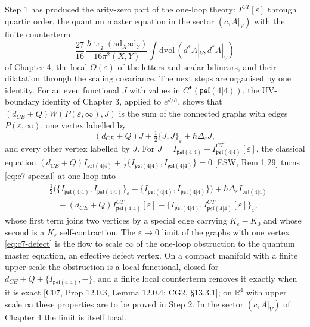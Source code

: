 Step 1 has produced the arity-zero part of the one-loop theory: $I^{CT}[\varepsilon]$ through quartic order, the quantum master equation in the sector $(c,A|_V)$ with the finite counterterm
\[
\frac{27}{16}\,\frac{\hbar\operatorname{tr}_{\mathfrak g}(\mathrm{ad}_X\mathrm{ad}_Y)}{16\pi^2(X,Y)}\int\mathrm{dvol}\,(d^*A|_V,d^*A|_V)
\]
of Chapter 4, the local $O(\varepsilon)$ of the letters and scalar bilinears, and their dilatation through the scaling covariance. The next steps are organised by one identity. For an even functional $J$ with values in $C^\bullet(\mathfrak{psl}(4|4))$, the UV-boundary identity of Chapter 3, applied to $e^{J/\hbar}$, shows that $(d_{CE}+Q)W(P(\varepsilon,\infty),J)$ is the sum of the connected graphs with edges $P(\varepsilon,\infty)$, one vertex labelled by
\begin{equation}
(d_{CE}+Q)J+\tfrac12\{J,J\}_\varepsilon+\hbar\Delta_\varepsilon J,
\label{eq:c7-special}
\end{equation}
and every other vertex labelled by $J$. For $J=I_{\mathfrak{psl}(4|4)}-I^{CT}_{\mathfrak{psl}(4|4)}[\varepsilon]$, the classical equation $(d_{CE}+Q)I_{\mathfrak{psl}(4|4)}+\tfrac12\{I_{\mathfrak{psl}(4|4)},I_{\mathfrak{psl}(4|4)}\}=0$ [ESW, Rem 1.29] turns \eqref{eq:c7-special} at one loop into
\begin{equation}
\begin{aligned}
&\tfrac12\Big(\{I_{\mathfrak{psl}(4|4)},I_{\mathfrak{psl}(4|4)}\}_\varepsilon-\{I_{\mathfrak{psl}(4|4)},I_{\mathfrak{psl}(4|4)}\}\Big)+\hbar\Delta_\varepsilon I_{\mathfrak{psl}(4|4)}\\
&\quad-(d_{CE}+Q)I^{CT}_{\mathfrak{psl}(4|4)}[\varepsilon]-\{I_{\mathfrak{psl}(4|4)},I^{CT}_{\mathfrak{psl}(4|4)}[\varepsilon]\}_\varepsilon ,
\end{aligned}
\label{eq:c7-defect}
\end{equation}
whose first term joins two vertices by a special edge carrying $K_\varepsilon-K_0$ and whose second is a $K_\varepsilon$ self-contraction. The $\varepsilon\to0$ limit of the graphs with one vertex \eqref{eq:c7-defect} is the flow to scale $\infty$ of the one-loop obstruction to the quantum master equation, an effective defect vertex. On a compact manifold with a finite upper scale the obstruction is a local functional, closed for $d_{CE}+Q+\{I_{\mathfrak{psl}(4|4)},-\}$, and a finite local counterterm removes it exactly when it is exact [C07, Prop 12.0.3, Lemma 12.0.4; CG2, §13.3.1]; on $\mathbb R^4$ with upper scale $\infty$ these properties are to be proved in Step 2. In the sector $(c,A|_V)$ of Chapter 4 the limit is itself local.

